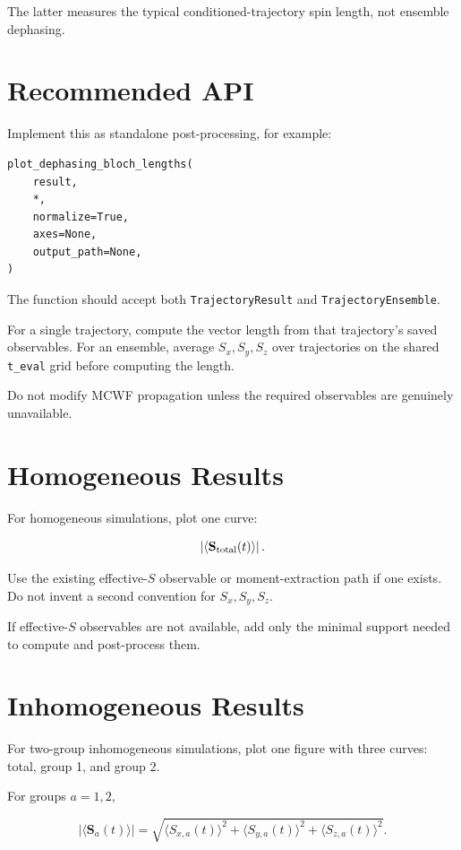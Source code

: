 \documentclass[11pt]{article}
\begin{document}
The latter measures the typical conditioned-trajectory spin length, not ensemble dephasing.

\section*{Recommended API}

Implement this as standalone post-processing, for example:

\begin{verbatim}
plot_dephasing_bloch_lengths(
    result,
    *,
    normalize=True,
    axes=None,
    output_path=None,
)
\end{verbatim}

The function should accept both \texttt{TrajectoryResult} and \texttt{TrajectoryEnsemble}.

For a single trajectory, compute the vector length from that trajectory's saved observables. For an ensemble, average \(S_x,S_y,S_z\) over trajectories on the shared \texttt{t\_eval} grid before computing the length.

Do not modify MCWF propagation unless the required observables are genuinely unavailable.

\section*{Homogeneous Results}

For homogeneous simulations, plot one curve:

\begin{equation}
\left|\langle \mathbf S_{\rm total}(t)\rangle\right|.
\end{equation}

Use the existing effective-\(S\) observable or moment-extraction path if one exists. Do not invent a second convention for \(S_x,S_y,S_z\).

If effective-\(S\) observables are not available, add only the minimal support needed to compute and post-process them.

\section*{Inhomogeneous Results}

For two-group inhomogeneous simulations, plot one figure with three curves: total, group 1, and group 2.

For groups \(a=1,2\),

\begin{equation}
\left|\langle \mathbf S_a(t)\rangle\right|
=
\sqrt{
\langle S_{x,a}(t)\rangle^2+
\langle S_{y,a}(t)\rangle^2+
\langle S_{z,a}(t)\rangle^2
}.
\end{equation}
\end{document}
